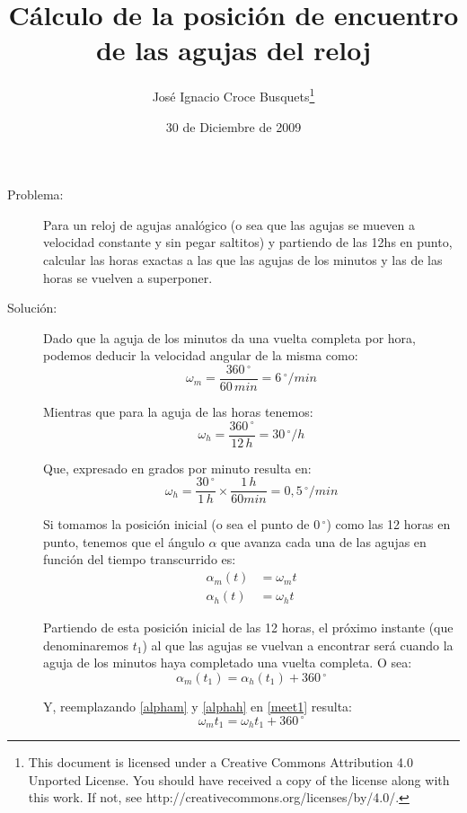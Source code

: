 \documentclass[a4paper,11pt]{article}
\author{Jos\'e Ignacio Croce Busquets\footnote{This document is licensed under a Creative Commons Attribution 4.0 Unported License.  You should have received a copy of the license along with this work.  If not, see http://creativecommons.org/licenses/by/4.0/.}}
\date{30 de Diciembre de 2009}
\title{C\'alculo de la posici\'on de encuentro de las agujas del reloj}
\begin{document}
\maketitle
\begin{description}
\item[Problema:]
Para un reloj de agujas anal\'ogico (o sea que las agujas se mueven a
velocidad constante y sin pegar saltitos) y partiendo de las 12hs en punto,
calcular las horas exactas a las que las agujas de los minutos y las de las
horas se vuelven a superponer.

\item[Soluci\'on:]
Dado que la aguja de los minutos da una vuelta completa por hora, podemos
deducir la velocidad angular de la misma como:
\begin{equation}
\omega_m = \frac{360\,^\circ}{60\,min} = 6\,^\circ/min \label{omegam}
\end{equation}

Mientras que para la aguja de las horas tenemos:
\begin{equation*}
\omega_h = \frac{360\,^\circ}{12\,h} = 30\,^\circ/h
\end{equation*}

Que, expresado en grados por minuto resulta en:
\begin{equation}
\omega_h = \frac{30\,^\circ}{1\,h} \times \frac{1\,h}{60min} = 0,5\,^\circ/min
\label{omegah}
\end{equation}

Si tomamos la posici\'on inicial (o sea el punto de $0\,^\circ$) como las 12
horas en punto, tenemos que el \'angulo $\alpha$ que avanza cada una de las
agujas en funci\'on del tiempo transcurrido es:
\begin{align}
\alpha_m(t) &= \omega_mt \label{alpham} \\
\alpha_h(t) &= \omega_ht \label{alphah}
\end{align}

Partiendo de esta posici\'on inicial de las 12 horas, el pr\'oximo instante
(que denominaremos $t_1$) al que las agujas se vuelvan a encontrar ser\'a
cuando la aguja de los minutos haya completado una vuelta completa. O sea:
\begin{equation}
\alpha_m(t_1) = \alpha_h(t_1) + 360\,^\circ
\label{meet1}
\end{equation}

Y, reemplazando \eqref{alpham} y \eqref{alphah} en \eqref{meet1} resulta:
\begin{equation*}
\omega_m t_1 = \omega_h t_1 + 360\,^\circ
\end{equation*}


\end{description}
\end{document}
